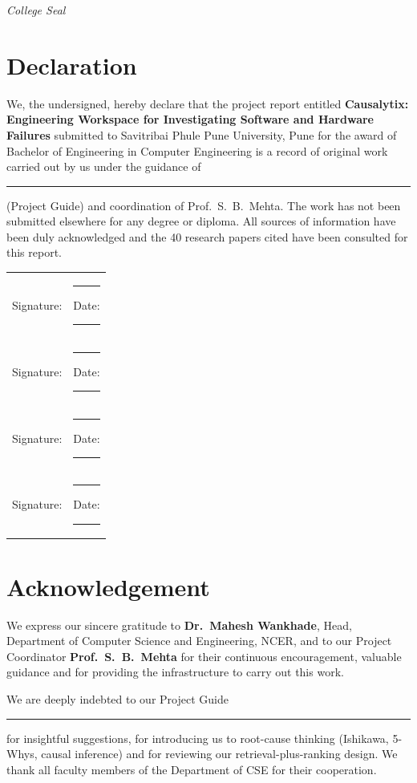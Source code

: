 \documentclass[12pt,a4paper,oneside]{report}
\newcommand{\projecttitle}{Causalytix: Engineering Workspace for Investigating Software and Hardware Failures}
\newcommand{\blankline}[1][3cm]{\rule{#1}{0.4pt}}
\begin{document}
\vspace{0.6cm}
\begin{flushright}
\small \textit{College Seal}
\end{flushright}

\chapter*{Declaration}
We, the undersigned, hereby declare that the project report entitled \textbf{\projecttitle} submitted to Savitribai Phule Pune University, Pune for the award of Bachelor of Engineering in Computer Engineering is a record of original work carried out by us under the guidance of \blankline[4cm] (Project Guide) and coordination of Prof.\ S.\ B.\ Mehta. The work has not been submitted elsewhere for any degree or diploma. All sources of information have been duly acknowledged and the 40 research papers cited have been consulted for this report.

\vspace{0.8cm}
\noindent
\begin{tabular}{l l}
Signature: & \blankline[5cm] \quad Date: \blankline[3cm]\\
Signature: & \blankline[5cm] \quad Date: \blankline[3cm]\\
Signature: & \blankline[5cm] \quad Date: \blankline[3cm]\\
Signature: & \blankline[5cm] \quad Date: \blankline[3cm]\\
\end{tabular}

\chapter*{Acknowledgement}
We express our sincere gratitude to \textbf{Dr.\ Mahesh Wankhade}, Head, Department of Computer Science and Engineering, NCER, and to our Project Coordinator \textbf{Prof.\ S.\ B.\ Mehta} for their continuous encouragement, valuable guidance and for providing the infrastructure to carry out this work.

We are deeply indebted to our Project Guide \blankline[5cm] for insightful suggestions, for introducing us to root-cause thinking (Ishikawa, 5-Whys, causal inference) and for reviewing our retrieval-plus-ranking design. We thank all faculty members of the Department of CSE for their cooperation.
\end{document}
